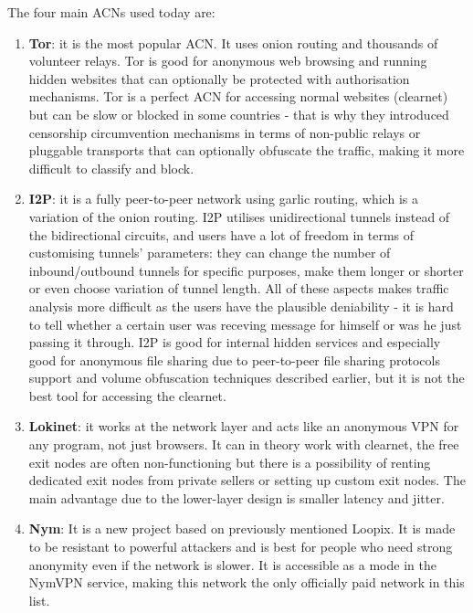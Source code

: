 The four main ACNs used today are:
\begin{enumerate}
    \item \textbf{Tor}: it is the most popular ACN. It uses onion routing and thousands of volunteer relays. Tor is good for anonymous web browsing and running hidden websites that can optionally be protected with authorisation mechanisms. Tor is a perfect ACN for accessing normal websites (clearnet) but can be slow or blocked in some countries - that is why they introduced censorship circumvention mechanisms in terms of non-public relays or pluggable transports that can optionally obfuscate the traffic, making it more difficult to classify and block.
    \item \textbf{I2P}: it is a fully peer-to-peer network using garlic routing, which is a variation of the onion routing. I2P utilises unidirectional tunnels instead of the bidirectional circuits, and users have a lot of freedom in terms of customising tunnels' parameters: they can change the number of inbound/outbound tunnels for specific purposes, make them longer or shorter or even choose variation of tunnel length. All of these aspects makes traffic analysis more difficult as the users have the plausible deniability - it is hard to tell whether a certain user was receving message for himself or was he just passing it through. I2P is good for internal hidden services and especially good for anonymous file sharing due to peer-to-peer file sharing protocols support and volume obfuscation techniques described earlier, but it is not the best tool for accessing the clearnet.
    \item \textbf{Lokinet}: it works at the network layer and acts like an anonymous VPN for any program, not just browsers. It can in theory work with clearnet, the free exit nodes are often non-functioning but there is a possibility of renting dedicated exit nodes from private sellers or setting up custom exit nodes. The main advantage due to the lower-layer design is smaller latency and jitter.
    \item \textbf{Nym}: It is a new project based on previously mentioned Loopix. It is made to be resistant to powerful attackers and is best for people who need strong anonymity even if the network is slower. It is accessible as a mode in the NymVPN service, making this network the only officially paid network in this list.
\end{enumerate}

